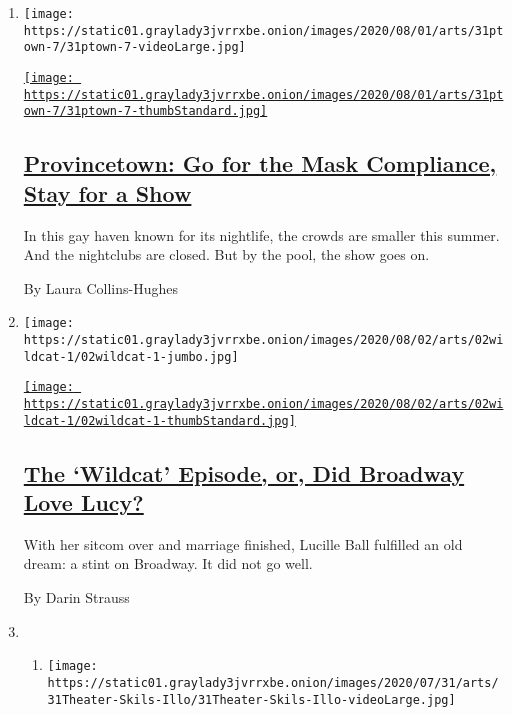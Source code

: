 \begin{enumerate}
\def\labelenumi{\arabic{enumi}.}
\item
  \texttt{[image: https://static01.graylady3jvrrxbe.onion/images/2020/08/01/arts/31ptown-7/31ptown-7-videoLarge.jpg]}

  \href{/2020/07/31/theater/provincetown-nightlife-coronavirus.html}{\texttt{[image: https://static01.graylady3jvrrxbe.onion/images/2020/08/01/arts/31ptown-7/31ptown-7-thumbStandard.jpg]}}

  \hypertarget{provincetown-go-for-the-mask-compliance-stay-for-a-show}{%
  \subsection{\texorpdfstring{\href{/2020/07/31/theater/provincetown-nightlife-coronavirus.html}{Provincetown:
  Go for the Mask Compliance, Stay for a
  Show}}{Provincetown: Go for the Mask Compliance, Stay for a Show}}\label{provincetown-go-for-the-mask-compliance-stay-for-a-show}}

  In this gay haven known for its nightlife, the crowds are smaller this
  summer. And the nightclubs are closed. But by the pool, the show goes
  on.

  By Laura Collins-Hughes
\item
  \texttt{[image: https://static01.graylady3jvrrxbe.onion/images/2020/08/02/arts/02wildcat-1/02wildcat-1-jumbo.jpg]}

  \href{/2020/07/31/theater/lucille-ball-wildcat.html}{\texttt{[image: https://static01.graylady3jvrrxbe.onion/images/2020/08/02/arts/02wildcat-1/02wildcat-1-thumbStandard.jpg]}}

  \hypertarget{the-wildcat-episode-or-did-broadway-love-lucy}{%
  \subsection{\texorpdfstring{\href{/2020/07/31/theater/lucille-ball-wildcat.html}{The
  `Wildcat' Episode, or, Did Broadway Love
  Lucy?}}{The `Wildcat' Episode, or, Did Broadway Love Lucy?}}\label{the-wildcat-episode-or-did-broadway-love-lucy}}

  With her sitcom over and marriage finished, Lucille Ball fulfilled an
  old dream: a stint on Broadway. It did not go well.

  By Darin Strauss
\item
  \begin{enumerate}
  \def\labelenumii{\arabic{enumii}.}
  \item
    \texttt{[image: https://static01.graylady3jvrrxbe.onion/images/2020/07/31/arts/31Theater-Skils-Illo/31Theater-Skils-Illo-videoLarge.jpg]}


\end{enumerate}
\end{enumerate}
